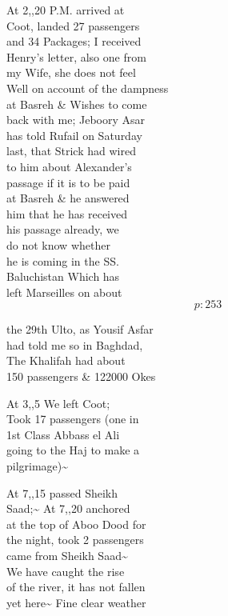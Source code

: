 \documentclass{report}
\begin{document}
	\par{
 	At 2,,20 P.M. arrived at\ \\Coot, landed 27 passengers\ \\and 34 Packages; I received\ \\Henry’s letter, also one from\ \\my Wife, she does not feel\ \\Well on account of the dampness\ \\at Basreh \& Wishes to come\ \\back with me; Jeboory Asar\ \\has told Rufail on Saturday\ \\last, that Strick had wired\ \\to him about Alexander’s\ \\passage if it is to be paid\ \\at Basreh \& he answered\ \\him that he has received\ \\his passage already, we\ \\do not know whether\ \\he is coming in the SS.\ \\Baluchistan Which has\ \\left Marseilles on about\ \\
  \[p: 253 \]

	}


	\par{
 	the 29th Ulto, as Yousif Asfar\ \\had told me so in Baghdad,\ \\The Khalifah had about\ \\150 passengers \& 122000 Okes\ \\
	}

	\par{
 	At 3,,5 We left Coot;\ \\Took 17 passengers (one in\ \\1st Class Abbass el Ali\ \\going to the Haj to make a\ \\pilgrimage)\~{}\ \\
	}

	\par{
 	At 7,,15 passed Sheikh\ \\Saad;\~{} At 7,,20 anchored\ \\at the top of Aboo Dood for\ \\the night, took 2 passengers\ \\came from Sheikh Saad\~{}\ \\We have caught the rise\ \\of the river, it has not fallen\ \\yet here\~{} Fine clear weather\ \\
	}
\end{document}
